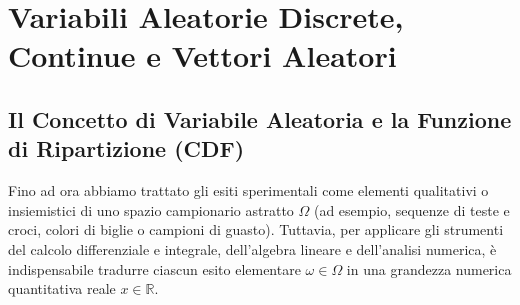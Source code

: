 \chapter{Variabili Aleatorie Discrete, Continue e Vettori Aleatori}
\label{cap:variabili_aleatorie}

\begin{abstract}
Il presente capitolo opera la transizione concettuale fondamentale dalla teoria degli insiemi astratti alla modellazione quantitativa mediante funzioni a valori reali: le variabili aleatorie. Viene formalizzata la nozione di misurabilità e analizzata la Funzione di Ripartizione (CDF) come descrittore universale sia per leggi discrete che per leggi continue. Si approfondiscono le specificità delle variabili discrete (PMF) e delle variabili assolutamente continue (PDF), chiarendo la natura infinitesima della densità e il significato epistemologico della probabilità puntuale nulla. Nella seconda parte, la teoria viene estesa ai vettori aleatori bivariati: densità congiunte, distribuzioni marginali, leggi condizionate, indipendenza stocastica e la formula analitica del cambio di variabile con fattore Jacobiano di distorsione geometrica.
\end{abstract}

\section{Il Concetto di Variabile Aleatoria e la Funzione di Ripartizione (CDF)}
\label{sec:concetto_va_cdf}

Fino ad ora abbiamo trattato gli esiti sperimentali come elementi qualitativi o insiemistici di uno spazio campionario astratto $\Omega$ (ad esempio, sequenze di teste e croci, colori di biglie o campioni di guasto). Tuttavia, per applicare gli strumenti del calcolo differenziale e integrale, dell'algebra lineare e dell'analisi numerica, è indispensabile tradurre ciascun esito elementare $\omega \in \Omega$ in una grandezza numerica quantitativa reale $x \in \mathbb{R}$.

